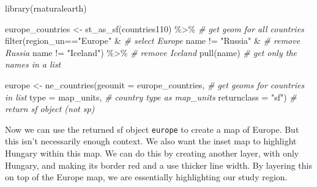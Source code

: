 \documentclass[
]{book}
\newenvironment{Shaded}{\begin{snugshade}}{\end{snugshade}}
\newcommand{\AttributeTok}[1]{\textcolor[rgb]{0.77,0.63,0.00}{#1}}
\newcommand{\CommentTok}[1]{\textcolor[rgb]{0.56,0.35,0.01}{\textit{#1}}}
\newcommand{\FunctionTok}[1]{\textcolor[rgb]{0.00,0.00,0.00}{#1}}
\newcommand{\NormalTok}[1]{#1}
\newcommand{\OtherTok}[1]{\textcolor[rgb]{0.56,0.35,0.01}{#1}}
\newcommand{\SpecialCharTok}[1]{\textcolor[rgb]{0.00,0.00,0.00}{#1}}
\newcommand{\StringTok}[1]{\textcolor[rgb]{0.31,0.60,0.02}{#1}}
\begin{document}
\begin{Shaded}
\begin{Highlighting}[]
\FunctionTok{library}\NormalTok{(rnaturalearth)}

\NormalTok{europe\_countries }\OtherTok{\textless{}{-}} \FunctionTok{st\_as\_sf}\NormalTok{(countries110) }\SpecialCharTok{\%\textgreater{}\%}  \CommentTok{\# get geom for all countries}
  \FunctionTok{filter}\NormalTok{(region\_un}\SpecialCharTok{==}\StringTok{"Europe"} \SpecialCharTok{\&} \CommentTok{\# select Europe}
\NormalTok{           name }\SpecialCharTok{!=} \StringTok{"Russia"} \SpecialCharTok{\&}   \CommentTok{\# remove Russia}
\NormalTok{           name }\SpecialCharTok{!=} \StringTok{"Iceland"}\NormalTok{) }\SpecialCharTok{\%\textgreater{}\%} \CommentTok{\# remove Iceland}
  \FunctionTok{pull}\NormalTok{(name) }\CommentTok{\# get only the names in a list}

\NormalTok{europe }\OtherTok{\textless{}{-}} \FunctionTok{ne\_countries}\NormalTok{(}\AttributeTok{geounit =}\NormalTok{ europe\_countries, }\CommentTok{\# get geoms for countries in list}
                       \AttributeTok{type =} \StringTok{\textquotesingle{}map\_units\textquotesingle{}}\NormalTok{,  }\CommentTok{\# country type as map\_units}
                       \AttributeTok{returnclass =} \StringTok{"sf"}\NormalTok{) }\CommentTok{\# return sf object (not sp)}
\end{Highlighting}
\end{Shaded}

Now we can use the returned sf object \texttt{europe} to create a map of Europe. But this isn't necessarily enough context. We also want the inset map to highlight Hungary within this map. We can do this by creating another layer, with only Hungary, and making its border red and a use thicker line width. By layering this on top of the Europe map, we are essentially highlighting our study region.
\end{document}
